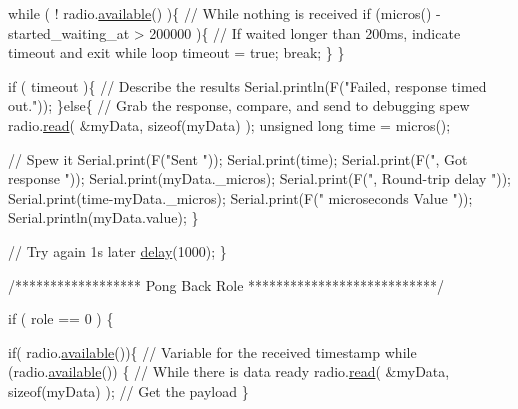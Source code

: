 \begin{DoxyCodeInclude}
    \textcolor{keywordflow}{while} ( ! radio.\hyperlink{classRF24_a127105eb7a3b351cfe777c1cec50627a}{available}() )\{                             \textcolor{comment}{// While nothing is received}
      \textcolor{keywordflow}{if} (micros() - started\_waiting\_at > 200000 )\{            \textcolor{comment}{// If waited longer than 200ms, indicate
       timeout and exit while loop}
          timeout = \textcolor{keyword}{true};
          \textcolor{keywordflow}{break};
      \}      
    \}
        
    \textcolor{keywordflow}{if} ( timeout )\{                                             \textcolor{comment}{// Describe the results}
        Serial.println(F(\textcolor{stringliteral}{"Failed, response timed out."}));
    \}\textcolor{keywordflow}{else}\{
                                                                \textcolor{comment}{// Grab the response, compare, and send to
       debugging spew}
        radio.\hyperlink{classRF24_a8e2eacacfba96426c192066f04054c5b}{read}( &myData, \textcolor{keyword}{sizeof}(myData) );
        \textcolor{keywordtype}{unsigned} \textcolor{keywordtype}{long} time = micros();
        
        \textcolor{comment}{// Spew it}
        Serial.print(F(\textcolor{stringliteral}{"Sent "}));
        Serial.print(time);
        Serial.print(F(\textcolor{stringliteral}{", Got response "}));
        Serial.print(myData.\_micros);
        Serial.print(F(\textcolor{stringliteral}{", Round-trip delay "}));
        Serial.print(time-myData.\_micros);
        Serial.print(F(\textcolor{stringliteral}{" microseconds Value "}));
        Serial.println(myData.value);
    \}

    \textcolor{comment}{// Try again 1s later}
    \hyperlink{group__Porting__General_ga70a331e8ddf9acf9d33c47b71cda4c5f}{delay}(1000);
  \}



\textcolor{comment}{/****************** Pong Back Role ***************************/}

  \textcolor{keywordflow}{if} ( role == 0 )
  \{
    
    \textcolor{keywordflow}{if}( radio.\hyperlink{classRF24_a127105eb7a3b351cfe777c1cec50627a}{available}())\{
                                                           \textcolor{comment}{// Variable for the received timestamp}
      \textcolor{keywordflow}{while} (radio.\hyperlink{classRF24_a127105eb7a3b351cfe777c1cec50627a}{available}()) \{                          \textcolor{comment}{// While there is data ready}
        radio.\hyperlink{classRF24_a8e2eacacfba96426c192066f04054c5b}{read}( &myData, \textcolor{keyword}{sizeof}(myData) );             \textcolor{comment}{// Get the payload}
      \}
     

\end{DoxyCodeInclude}
